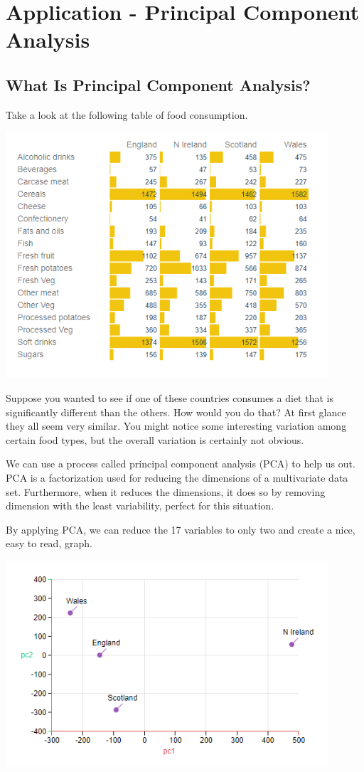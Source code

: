\documentclass{article}
\begin{document}
\section{Application - Principal Component Analysis}
\subsection{What Is Principal Component Analysis?}
Take a look at the following table of food consumption.

\begin{center}
\includegraphics[width=12cm]{(17)}
\end{center}


Suppose you wanted to see if one of these countries consumes a diet that is significantly different than the others. How would you do that? At first glance they all seem very similar. You might notice some interesting variation among certain food types, but the overall variation is certainly not obvious.
\bigskip

We can use a process called principal component analysis (PCA) to help us out. PCA is a factorization used for reducing the dimensions of a multivariate data set. Furthermore, when it reduces the dimensions, it does so by removing dimension with the least variability, perfect for this situation.
\bigskip

By applying PCA, we can reduce the 17 variables to only two and create a nice, easy to read, graph.

\begin{center}
\includegraphics[width=12cm]{(18).png}
\end{center}
\end{document}
